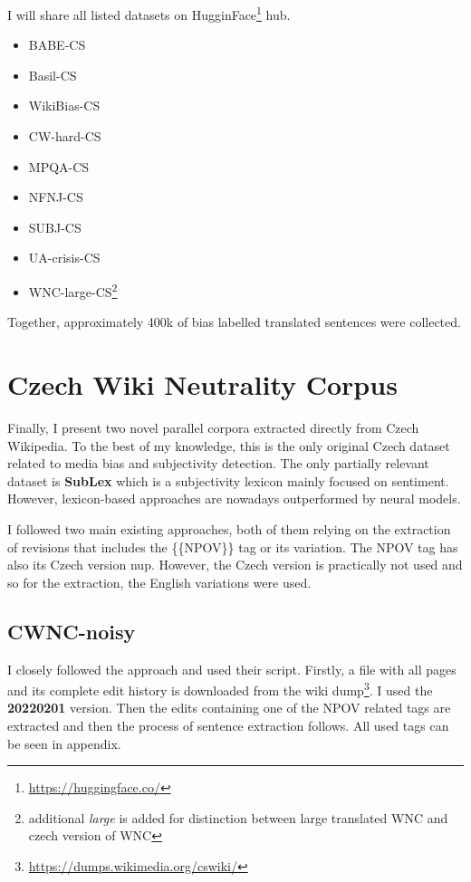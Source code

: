I will share all listed datasets on HugginFace\footnote{\url{https://huggingface.co/}} hub.

\begin{itemize}
    \item BABE-CS
    \item Basil-CS
    \item WikiBias-CS
    \item CW-hard-CS
    \item MPQA-CS
    \item NFNJ-CS
    \item SUBJ-CS
    \item UA-crisis-CS
    \item WNC-large-CS\footnote{additional \textit{large} is added for distinction between large translated WNC and czech version of WNC}
\end{itemize}

Together, approximately 400k of bias labelled translated sentences were collected.





\section{Czech Wiki Neutrality Corpus}
Finally, I present two novel parallel corpora extracted directly from Czech Wikipedia. To the best of my knowledge, this is the only original Czech dataset related to media bias and subjectivity detection. The only partially relevant dataset is \textbf{SubLex}\cite{11858/00-097C-0000-0022-FF60-B} which is a subjectivity lexicon mainly focused on sentiment. However, lexicon-based approaches are nowadays outperformed by neural models.

I followed two main existing approaches, both of them relying on the extraction of revisions that includes the \{\{NPOV\}\} tag or its variation. The NPOV tag has also its Czech version \Gls{nup}. However, the Czech version is practically not used and so for the extraction, the English variations were used.





\subsection{CWNC-noisy}
I closely followed the \cite{aleksandrova2019multilingual} approach and used their script. Firstly, a file with all pages and its complete edit history is downloaded from the wiki dump\footnote{\url{https://dumps.wikimedia.org/cswiki/}}. I used the \textbf{20220201} version. Then the edits containing one of the NPOV related tags are extracted and then the process of sentence extraction follows. All used tags can be seen in appendix.

